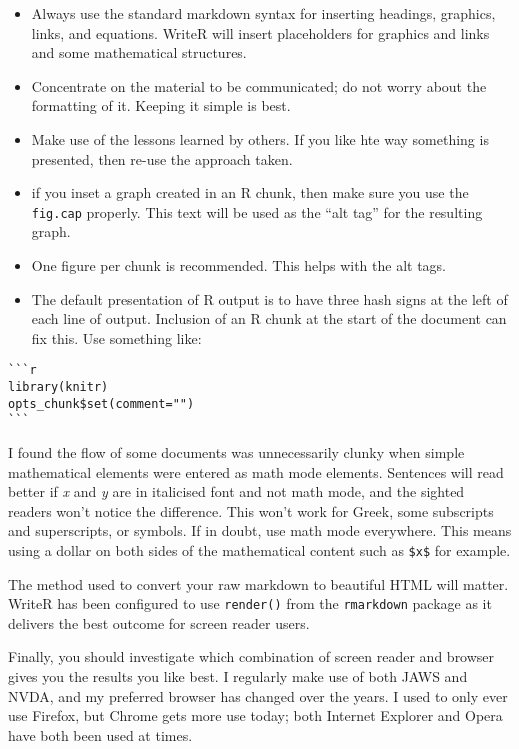 \documentclass[
]{book}
\providecommand{\tightlist}{%
  \setlength{\itemsep}{0pt}\setlength{\parskip}{0pt}}
\begin{document}
\begin{itemize}
\tightlist
\item
  Always use the standard markdown syntax for inserting headings, graphics, links, and equations. WriteR will insert placeholders for graphics and links and some mathematical structures.
\item
  Concentrate on the material to be communicated; do not worry about the formatting of it. Keeping it simple is best.
\item
  Make use of the lessons learned by others. If you like hte way something is presented, then re-use the approach taken.
\item
  if you inset a graph created in an R chunk, then make sure you use the \texttt{fig.cap} properly. This text will be used as the ``alt tag'' for the resulting graph.
\item
  One figure per chunk is recommended. This helps with the alt tags.
\item
  The default presentation of R output is to have three hash signs at the left of each line of output. Inclusion of an R chunk at the start of the document can fix this. Use something like:
\end{itemize}

\begin{verbatim}
```r
library(knitr)
opts_chunk$set(comment="")
```
\end{verbatim}

I found the flow of some documents was unnecessarily clunky when simple mathematical elements were entered as math mode elements. Sentences will read better if \emph{x} and \emph{y} are in italicised font and not math mode, and the sighted readers won't notice the difference. This won't work for Greek, some subscripts and superscripts, or symbols. If in doubt, use math mode everywhere. This means using a dollar on both sides of the mathematical content such as \texttt{\$x\$} for example.

The method used to convert your raw markdown to beautiful HTML will matter. WriteR has been configured to use \texttt{render()} from the \texttt{rmarkdown} package as it delivers the best outcome for screen reader users.

Finally, you should investigate which combination of screen reader and browser gives you the results you like best. I regularly make use of both JAWS and NVDA, and my preferred browser has changed over the years. I used to only ever use Firefox, but Chrome gets more use today; both Internet Explorer and Opera have both been used at times.
\end{document}

